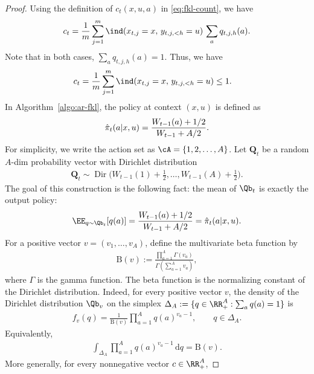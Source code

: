 \documentclass[11pt]{article}
\begin{document}
\begin{proof}
Using the definition of $c_t(x,u,a)$ in \eqref{eq:fkl-count}, we have
\begin{align}
\notag
    c_t=
    \frac{1}{m}\sum_{j=1}^m
    \ind(x_{t,j}=x,\,y_{t,j,<h}=u)\,
    \sum_a q_{t,j,h}(a).
\end{align}
Note that in both cases, $\sum_a q_{t,j,h}(a)=1$. Thus, we have
\begin{align}
\notag
    c_t
    &=
    \frac{1}{m}
    \sum_{j=1}^m
    \ind(x_{t,j}=x,\,y_{t,j,<h}=u)
    \leq 1.
\end{align}
In Algorithm~\ref{algo:ar-fkl}, the policy at context $(x,u)$ is defined as
\begin{align}
\notag
    \hat\pi_t(a|x,u)
    =
    \frac{W_{t-1}(a)+1/2}
         {W_{t-1}+A/2}.
\end{align}
For simplicity, we write the action set as $\cA = \{1,2,\ldots, A\}$. Let $\mathbf Q_t$ be a random $A$-dim
probability vector with Dirichlet distribution
\begin{align*}
    \mathbf Q_t
    \sim
    \operatorname{Dir}\bigg(
        W_{t-1}(1)+\frac12,\ldots,
        W_{t-1}(A)+\frac12
    \bigg).
\end{align*}
The goal of this construction is the following fact: the mean of $\Qb_t$ is exactly the output policy:
\begin{align}
\notag
    \EE_{q\sim \Qb_t}[q(a)]
    =
    \frac{W_{t-1}(a)+1/2}
         {W_{t-1}+A/2}
    =
    \hat\pi_t(a|x,u).
\end{align}
For a positive vector $v=(v_1,\ldots,v_A)$, define the multivariate beta
function by
\begin{align}
\label{eq:beta-function}
    \mathrm B(v)
    :=
    \frac{\prod_{a=1}^A\Gamma(v_a)}
         {\Gamma(\sum_{a=1}^A v_a)},
\end{align}
where $\Gamma$ is the gamma function. The beta function is the normalizing constant of the Dirichlet distribution. Indeed, for every positive vector $v$, the density of the Dirichlet distribution $\Qb_v$ on the simplex $\Delta_A := \{q \in \RR_+^A: \sum_a q(a) = 1\}$ is
\begin{align*}
    f_v(q)
    =
    \frac{1}{\mathrm B(v)}
    \prod_{a=1}^A q(a)^{v_a-1},
    \qquad q\in\Delta_A.
\end{align*}
Equivalently,
\begin{align*}
    \int_{\Delta_A}
    \prod_{a=1}^A q(a)^{v_a-1}\,\mathrm dq
    =
    \mathrm B(v).
\end{align*}
More generally, for every nonnegative vector $c\in\RR_+^A$,

\end{proof}
\end{document}
